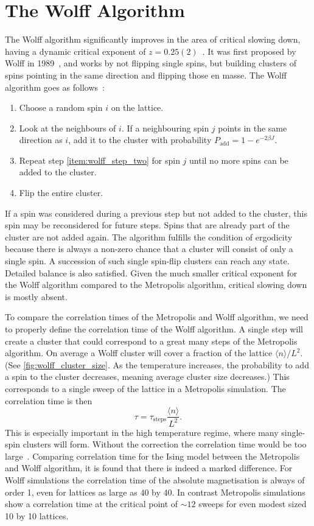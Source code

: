 \documentclass[11pt, a4paper]{report} %
\begin{document}
\section{The Wolff Algorithm}
The Wolff algorithm significantly improves in the area of critical slowing down, having a dynamic critical exponent of \(z=0.25(2)\)~\cite{newman:1999}.
It was first proposed by Wolff in 1989~\cite{wolff:1989}, and works by not flipping single spins, but building clusters of spins pointing in the same direction and flipping those en masse.
The Wolff algorithm goes as follows~\cite{landau:2015,newman:1999}:
\begin{enumerate}
	\item Choose a random spin \(i\) on the lattice.
	\item\label{item:wolff_step_two} Look at the neighbours of \(i\). If a neighbouring spin \(j\) points in the same direction as \(i\), add it to the cluster with probability \(P_{\mathrm{add}} = 1 - e^{-2\beta J}\).
	\item Repeat step \ref{item:wolff_step_two} for spin \(j\) until no more spins can be added to the cluster.
	\item Flip the entire cluster.
\end{enumerate}
If a spin was considered during a previous step but not added to the cluster, this spin may be reconsidered for future steps.
Spins that are already part of the cluster are not added again.
The algorithm fulfills the condition of ergodicity because there is always a non-zero chance that a cluster will consist of only a single spin.
A succession of such single spin-flip clusters can reach any state. Detailed balance is also satisfied.
Given the much smaller critical exponent for the Wolff algorithm compared to the Metropolis algorithm, critical slowing down is mostly absent.

To compare the correlation times of the Metropolis and Wolff algorithm, we need to properly define the correlation time of the Wolff algorithm.
A single step will create a cluster that could correspond to a great many steps of the Metropolis algorithm.
On average a Wolff cluster will cover a fraction of the lattice \(\langle n \rangle / L^2\). (See \cref{fig:wolff_cluster_size}. As the temperature increases, the probability to add a spin to the cluster decreases, meaning average cluster size decreases.)
This corresponds to a single sweep of the lattice in a Metropolis simulation.
The correlation time is then
\begin{equation}
	\tau = \tau_{\mathrm{steps}} \frac{\langle n \rangle}{L^2}.
\end{equation}
This is especially important in the high temperature regime, where many single-spin clusters will form.
Without the correction the correlation time would be too large~\cite{newman:1999}.
Comparing correlation time for the Ising model between the Metropolis and Wolff algorithm, it is found that there is indeed a marked difference.
For Wolff simulations the correlation time of the absolute magnetisation is always of order 1, even for lattices as large as 40 by 40.
In contrast Metropolis simulations show a correlation time at the critical point of \(\sim 12\) sweeps for even modest sized 10 by 10 lattices.
\end{document}
